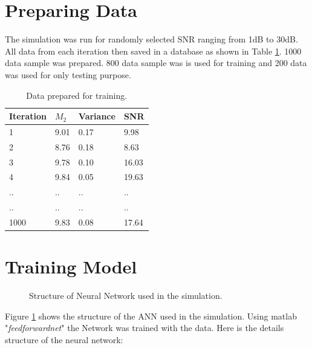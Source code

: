 \documentclass[12pt]{report}
\begin{document}
\section{Preparing Data}
The simulation was run for randomly selected SNR ranging from 1dB to 30dB. All data from each iteration then saved in a database as shown in Table \ref{table:dataset}. 1000 data sample was prepared. 800 data sample was is used for training and 200 data was used for only testing purpose.
\begin{table}[h!]
	\caption{Data prepared for training.}
	\begin{center}
		\centering
		\begin{tabular}{ |p{3cm}|p{3cm}|p{3cm}|p{3cm}| } 
			\hline
			\hfil Iteration & \hfil $M_2$ & \hfil Variance & \hfil SNR \\ 
			\hline
			\hfil 1 & \hfil 9.01 & \hfil 0.17 & \hfil 9.98 \\ 
			\hline
			\hfil 2 & \hfil 8.76 & \hfil 0.18 & \hfil 8.63 \\ 
			\hline
			\hfil 3 & \hfil 9.78 & \hfil 0.10 & \hfil 16.03 \\ 
			\hline
			\hfil 4 & \hfil 9.84 & \hfil 0.05 & \hfil 19.63 \\ 
			\hline
			\hfil .. & \hfil .. & \hfil .. & \hfil .. \\ 
			\hline
			\hfil .. & \hfil .. & \hfil .. & \hfil .. \\ 
			\hline
			\hfil 1000 & \hfil 9.83 & \hfil 0.08 & \hfil 17.64 \\ 
			\hline
		\end{tabular}
		\label{table:dataset}
	\end{center}
\end{table}
\section{Training Model}
\begin{figure}[htbp]
	\caption{Structure of Neural Network used in the simulation.}
	\label{fig:net}
\end{figure}
Figure \ref{fig:net} shows the structure of the ANN used in the simulation. Using matlab "\textit{feedforwardnet}" the Network was trained with the data. Here is the details structure of the neural network:
\end{document}

